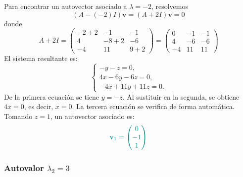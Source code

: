 \documentclass{article}
\begin{document}
\begin{enumerate}[label=\textbf{\alph*)}]
    Para encontrar un autovector asociado a \( \lambda=-2 \), resolvemos
    \[
    (A - (-2)I)\mathbf{v} = (A + 2I)\mathbf{v} = 0
    \]
    donde
    \[
    A + 2I =
    \begin{pmatrix}
    -2+2 & -1 & -1 \\
    4 & -8+2 & -6 \\
    -4 & 11 & 9+2
    \end{pmatrix}
    =
    \begin{pmatrix}
    0 & -1 & -1 \\
    4 & -6 & -6 \\
    -4 & 11 & 11
    \end{pmatrix}
    \]
    El sistema resultante es:
    \[
    \begin{cases}
    -y - z = 0, \\
    4x - 6y - 6z = 0, \\
    -4x + 11y + 11z = 0.
    \end{cases}
    \]
    De la primera ecuación se tiene \( y = -z \). Al sustituir en la segunda, se obtiene \( 4x = 0 \), es decir, \( x = 0 \). La tercera ecuación se verifica de forma automática. Tomando \( z = 1 \), un autovector asociado es:
    \[\color{teal}
    \mathbf{v}_1 = \begin{pmatrix} 0 \\ -1 \\ 1 \end{pmatrix}
    \]
    
    \subsubsection*{Autovalor \( \lambda_2 = 3 \)}
    

\end{enumerate}
\end{document}
